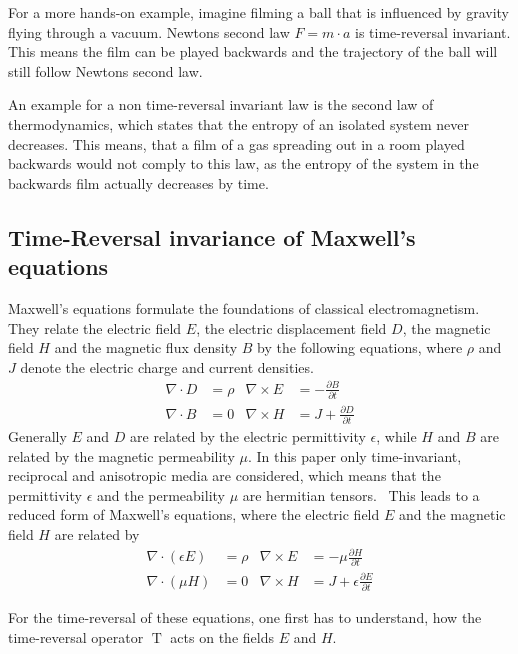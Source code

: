 For a more hands-on example, imagine filming a ball that is influenced by gravity flying through a vacuum.
Newtons second law \({F}=m \cdot {a}\) is time-reversal invariant. This means the film can be played backwards and the trajectory of the ball will still follow Newtons second law.

An example for a non time-reversal invariant law is the second law of thermodynamics, which states that the entropy of an isolated system never decreases.
This means, that a film of a gas spreading out in a room played backwards would not comply to this law, as the entropy of the system in the backwards film actually decreases by time.



\subsection{Time-Reversal invariance of Maxwell's equations}
Maxwell's equations formulate the foundations of classical electromagnetism.
They relate the electric field \(E\), the electric displacement field \(D\), the magnetic field \(H\) and the magnetic flux density \(B\)  by the following equations, where \(\rho \) and \({J}\) denote the electric charge and current densities.
\begin{align}\label{eq:maxwell}
    \nabla \cdot D &= \rho & \nabla \times E &= -\frac{\partial B}{\partial t} \\
    \nabla \cdot B &= 0 & \nabla \times H &= J + \frac{\partial D}{\partial t}
\end{align}
Generally \(E\) and \(D\) are related by the electric permittivity \(\epsilon \), while \(H\) and \(B\) are related by the magnetic permeability \(\mu \).
In this paper only time-invariant, reciprocal and anisotropic media are considered, which means that the permittivity \(\epsilon \) and the permeability \(\mu \) are hermitian tensors.~\parencite{krowne_electromagnetic_1984}
This leads to a reduced form of Maxwell's equations, where the electric field \(E\) and the magnetic field \(H\) are related by
\begin{align}\label{eq:maxwell_reciprocal}
    \nabla \cdot (\epsilon E) &= \rho & \nabla \times E &= -\mu \frac{\partial H}{\partial t} \\
    \nabla \cdot (\mu H) &= 0 & \nabla \times H &= J + \epsilon \frac{\partial E}{\partial t}
\end{align}

For the time-reversal of these equations, one first has to understand, how the time-reversal operator \(\operatorname{T}\) acts on the fields \(E\) and \(H\).

